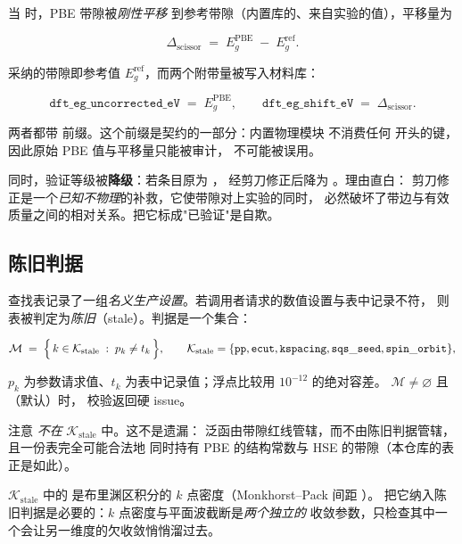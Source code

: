 当  时，PBE 带隙被\emph{刚性平移}
到参考带隙（内置库的、来自实验的值），平移量为

\begin{equation}
\Delta_{\text{scissor}} \;=\; E_g^{\text{PBE}} \;-\; E_g^{\text{ref}} .
\label{eq:scissor}
\end{equation}

采纳的带隙即参考值 $E_g^{\text{ref}}$，而两个附带量被写入材料库：

\begin{equation}
\mathtt{dft\_eg\_uncorrected\_eV} \;=\; E_g^{\text{PBE}},
\qquad
\mathtt{dft\_eg\_shift\_eV} \;=\; \Delta_{\text{scissor}} .
\label{eq:scissor-record}
\end{equation}

两者都带  前缀。这个前缀是契约的一部分：内置物理模块
不消费任何  开头的键，因此原始 PBE 值与平移量只能被审计，
不可能被误用。

同时，验证等级被\textbf{降级}：若条目原为 ，
经剪刀修正后降为 。理由直白：
剪刀修正是一个\emph{已知不物理}的补救，它使带隙对上实验的同时，
必然破坏了带边与有效质量之间的相对关系。把它标成"已验证"是自欺。

\subsection{陈旧判据}
\label{sec:dft-stale}

查找表记录了一组\emph{名义生产设置}。若调用者请求的数值设置与表中记录不符，
则表被判定为\emph{陈旧}（stale）。判据是一个集合：

\begin{equation}
\mathcal{M} \;=\;
\Bigl\{\, k \in \mathcal{K}_{\text{stale}} \;:\; p_k \neq t_k \,\Bigr\},
\qquad
\mathcal{K}_{\text{stale}} = \{
\mathtt{pp}, \mathtt{ecut}, \mathtt{kspacing}, \mathtt{sqs\_seed}, \mathtt{spin\_orbit}
\},
\label{eq:stale}
\end{equation}

$p_k$ 为参数请求值、$t_k$ 为表中记录值；浮点比较用 $10^{-12}$ 的绝对容差。
$\mathcal{M}\neq\varnothing$ 且 （默认）时，
校验返回硬 issue。

注意  \emph{不在} $\mathcal{K}_{\text{stale}}$ 中。这不是遗漏：
泛函由带隙红线管辖，而不由陈旧判据管辖，且一份表完全可能合法地
同时持有 PBE 的结构常数与 HSE 的带隙（本仓库的表正是如此）。

$\mathcal{K}_{\text{stale}}$ 中的  是布里渊区积分的
$k$ 点密度（Monkhorst--Pack 间距 \cite{monkhorstPack1976}）。
把它纳入陈旧判据是必要的：$k$ 点密度与平面波截断是\emph{两个独立的}
收敛参数，只检查其中一个会让另一维度的欠收敛悄悄溜过去。

